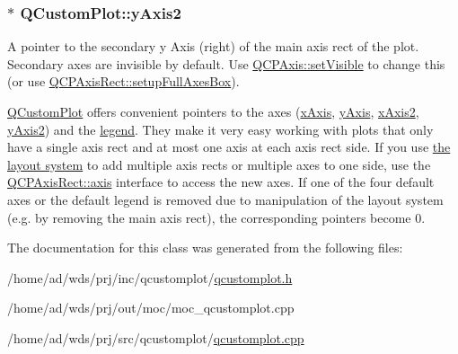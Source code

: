 \subsubsection[{\texorpdfstring{y\+Axis2}{yAxis2}}]{ $\ast$ Q\+Custom\+Plot\+::y\+Axis2}\hypertarget{class_q_custom_plot_af13fdc5bce7d0fabd640f13ba805c0b7}{}\label{class_q_custom_plot_af13fdc5bce7d0fabd640f13ba805c0b7}
A pointer to the secondary y Axis (right) of the main axis rect of the plot. Secondary axes are invisible by default. Use \hyperlink{class_q_c_p_layerable_a3bed99ddc396b48ce3ebfdc0418744f8}{Q\+C\+P\+Axis\+::set\+Visible} to change this (or use \hyperlink{class_q_c_p_axis_rect_a5fa906175447b14206954f77fc7f1ef4}{Q\+C\+P\+Axis\+Rect\+::setup\+Full\+Axes\+Box}).

\hyperlink{class_q_custom_plot}{Q\+Custom\+Plot} offers convenient pointers to the axes (\hyperlink{class_q_custom_plot_a9a79cd0158a4c7f30cbc702f0fd800e4}{x\+Axis}, \hyperlink{class_q_custom_plot_af6fea5679725b152c14facd920b19367}{y\+Axis}, \hyperlink{class_q_custom_plot_ada41599f22cad901c030f3dcbdd82fd9}{x\+Axis2}, \hyperlink{class_q_custom_plot_af13fdc5bce7d0fabd640f13ba805c0b7}{y\+Axis2}) and the \hyperlink{class_q_custom_plot_a4eadcd237dc6a09938b68b16877fa6af}{legend}. They make it very easy working with plots that only have a single axis rect and at most one axis at each axis rect side. If you use \hyperlink{}{the layout system} to add multiple axis rects or multiple axes to one side, use the \hyperlink{class_q_c_p_axis_rect_a560de44e47a4af0f86c59102a094b1e4}{Q\+C\+P\+Axis\+Rect\+::axis} interface to access the new axes. If one of the four default axes or the default legend is removed due to manipulation of the layout system (e.\+g. by removing the main axis rect), the corresponding pointers become 0. 

The documentation for this class was generated from the following files\+:\begin{DoxyCompactItemize}
\item 
/home/ad/wds/prj/inc/qcustomplot/\hyperlink{qcustomplot_8h}{qcustomplot.\+h}\item 
/home/ad/wds/prj/out/moc/moc\+\_\+qcustomplot.\+cpp\item 
/home/ad/wds/prj/src/qcustomplot/\hyperlink{qcustomplot_8cpp}{qcustomplot.\+cpp}\end{DoxyCompactItemize}

